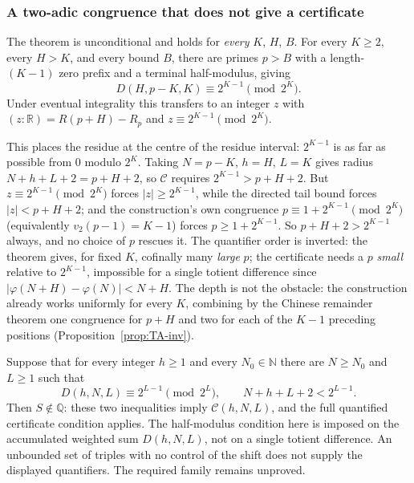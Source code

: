 \subsubsection{A two-adic congruence that does not give a certificate}

\begin{thm}\label{thm:two-adic-congruence-that-does}
The theorem is unconditional and holds for \emph{every} $K$, $H$, $B$.
For every $K\ge 2$, every $H>K$, and every bound $B$, there are primes
$p>B$ with a length-$(K{-}1)$ zero prefix and a terminal half-modulus, giving
\[
  D(H,p-K,K) \equiv 2^{K-1} \pmod{2^K}.
\]
Under eventual integrality this transfers to an integer $z$ with $(z:\mathbb R) =
{R}(p{+}H) - R_{p}$ and $z\equiv 2^{K-1}\pmod{2^K}$.
\end{thm}

\begin{rem}
This places the residue at the centre of the residue interval: $2^{K-1}$ is
as far as possible from $0$ modulo $2^K$. Taking $N{=}p{-}K$,
$h{=}H$, $L{=}K$ gives radius $N{+}h{+}L{+}2 = p{+}H{+}2$, so $\mathcal{C}$ requires
$2^{K-1} > p{+}H{+}2$. But $z\equiv 2^{K-1}\pmod{2^K}$ forces $|z|\ge 2^{K-1}$, while the directed
tail bound forces $|z| < p{+}H{+}2$; and the construction's own congruence
$p\equiv 1{+}2^{K-1}\pmod{2^K}$ (equivalently $v_2(p{-}1)=K{-}1$) forces $p\ge 1{+}2^{K-1}$. So
$p{+}H{+}2 > 2^{K-1}$ always, and no choice of $p$ rescues it. The quantifier order is inverted:
the theorem gives, for fixed $K$, cofinally many \emph{large} $p$; the certificate needs a $p$
\emph{small} relative to $2^{K-1}$, impossible for a single totient
difference since $|\varphi(N{+}H)-\varphi(N)| < N{+}H$. The depth is not the
obstacle: the construction already works uniformly for every $K$,
combining by the Chinese remainder theorem one congruence for $p+H$ and
two for each of the $K-1$ preceding positions
(Proposition~\ref{prop:TA-inv}).
\end{rem}

\begin{prop}\label{prop:sufficient-accumulated-residue-condition}
Suppose that for every integer $h\ge1$ and every $N_0\in\mathbb N$
there are $N\ge N_0$ and $L\ge1$ such that
\[
 D(h,N,L)\equiv2^{L-1}\pmod{2^L},\qquad
 N+h+L+2<2^{L-1}.
\]
Then $S\notin\mathbb Q$: these two inequalities imply
$\mathcal C(h,N,L)$, and the full quantified certificate condition
applies. The half-modulus condition here is imposed on the accumulated
weighted sum $D(h,N,L)$, not on a single totient difference.
An unbounded set of triples with no control of the shift does not
supply the displayed quantifiers. The required family remains unproved.
\end{prop}

